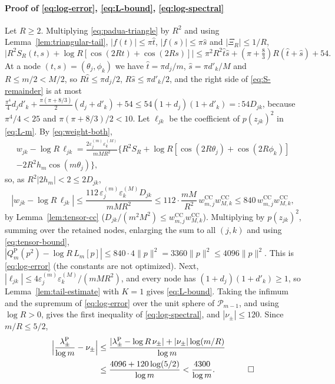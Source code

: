 \documentclass[preprint,12pt,a4paper]{elsarticle}
\theoremstyle{remark}
\newcommand{\CC}{\mathrm{CC}}
\newcommand{\Pa}{\mathrm P}
\begin{document}
\paragraph{Proof of \eqref{eq:log-error}, \eqref{eq:L-bound}, \eqref{eq:log-spectral}}
Let $R\ge2$. Multiplying \eqref{eq:padua-triangle} by $R^2$ and using
Lemma~\ref{lem:triangular-tail}, $|f(t)|\le\pi\hat t$, $|f(s)|\le\pi\hat s$ and
$|\Xi_R|\le1/R$,
\begin{equation}\label{eq:S-remainder}
 \bigl|R^2S_R(t,s)+\log R[\cos(2Rt)+\cos(2Rs)]\bigr|
 \le\pi^2R^2\hat t\hat s+(\pi+\tfrac83)R(\hat t+\hat s)+54 .
\end{equation}
At a node $(t,s)=(\theta_j,\phi_k)$ we have $\hat t=\pi d_j/m$, $\hat s=\pi d'_k/M$
and $R\le m/2<M/2$, so $R\hat t\le\pi d_j/2$, $R\hat s\le\pi d'_k/2$, and the right
side of \eqref{eq:S-remainder} is at most
$\frac{\pi^4}4d_jd'_k+\frac{\pi(\pi+8/3)}2(d_j+d'_k)+54\le54(1+d_j)(1+d'_k)=:54D_{jk}$,
because $\pi^4/4<25$ and $\pi(\pi+8/3)/2<10$. Let
$\ell_{jk}$ be the coefficient of $p(z_{jk})^2$ in \eqref{eq:L-m}. By
\eqref{eq:weight-both},
\begin{multline*}
 w_{jk}-\log R\,\ell_{jk}=\frac{2\varepsilon^{(m)}_j\varepsilon^{(M)}_k}{mMR^2}
 \bigl\{R^2S_R+\log R[\cos(2R\theta_j)+\cos(2R\phi_k)]\\
 -2R^2h_m\cos(m\theta_j)\bigr\},
\end{multline*}
so, as $R^2|2h_m|<2\le2D_{jk}$,
\[
 |w_{jk}-\log R\,\ell_{jk}|\le\frac{112\,\varepsilon^{(m)}_j\varepsilon^{(M)}_kD_{jk}}{mMR^2}
 \le112\cdot\frac{mM}{R^2}\,w^{\CC}_{m,j}w^{\CC}_{M,k}\le840\,w^{\CC}_{m,j}w^{\CC}_{M,k} ,
\]
by Lemma~\ref{lem:tensor-cc} ($D_{jk}/(m^2M^2)\le w^{\CC}_{m,j}w^{\CC}_{M,k}$). Multiplying by
$p(z_{jk})^2$, summing over the retained nodes, enlarging the sum to all
$(j,k)$ and using \eqref{eq:tensor-bound},
$|Q_m^\Pa(p^2)-\log R\,L_m[p]|\le840\cdot4\|p\|^2=3360\|p\|^2\le4096\|p\|^2$.
This is \eqref{eq:log-error} (the constants are not optimized).
Next, $|\ell_{jk}|\le4\varepsilon^{(m)}_j\varepsilon^{(M)}_k/(mMR^2)$, and every node has
$(1+d_j)(1+d'_k)\ge1$, so Lemma~\ref{lem:tail-estimate} with $K=1$ gives
\eqref{eq:L-bound}. Taking the infimum and the supremum of
\eqref{eq:log-error} over the unit sphere of $\mathcal P_{m-1}$, and using
$\log R>0$, gives the first inequality of \eqref{eq:log-spectral}, and
$|\nu_\pm|\le120$. Since $m/R\le5/2$,
\begin{align*}
 \Bigl|\frac{\lambda^\Pa_\pm}{\log m}-\nu_\pm\Bigr|
 &\le\frac{|\lambda^\Pa_\pm-\log R\,\nu_\pm|+|\nu_\pm|\log(m/R)}{\log m}\\
 &\le\frac{4096+120\log(5/2)}{\log m}<\frac{4300}{\log m}.\qquad\qed
\end{align*}
\end{document}
